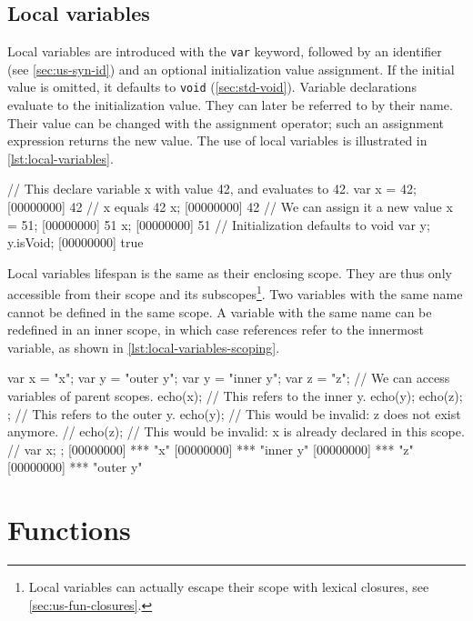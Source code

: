 \subsection{Local variables}

Local variables are introduced with the \lstinline|var| keyword,
followed by an identifier (see \autoref{sec:us-syn-id}) and an optional
initialization value assignment. If the initial value is omitted, it
defaults to \lstinline"void" (\autoref{sec:std-void}). Variable
declarations evaluate to
the initialization value. They can later be referred to by their
name. Their value can be changed with the assignment operator; such an
assignment expression returns the new value. The use of local
variables is illustrated in \autoref{lst:local-variables}.

\begin{urbiscript}[caption=Using local variables,
  label=lst:local-variables,float=\floatpos]
// This declare variable x with value 42, and evaluates to 42.
var x = 42;
[00000000] 42
// x equals 42
x;
[00000000] 42
// We can assign it a new value
x = 51;
[00000000] 51
x;
[00000000] 51
// Initialization defaults to void
var y;
y.isVoid;
[00000000] true
\end{urbiscript}

Local variables lifespan is the same as their enclosing scope. They
are thus only accessible from their scope and its
subscopes\footnote{Local variables can actually escape their scope
  with lexical closures, see \autoref{sec:us-fun-closures}.}. Two
variables with the same name cannot be defined in the same scope. A
variable with the same name can be redefined in an inner scope, in which
case references refer to the innermost variable, as shown in
\autoref{lst:local-variables-scoping}.

\begin{urbiscript}[caption=Local variables scoping,
  label=lst:local-variables-scoping,float=\floatpos]
{
  var x = "x";
  var y = "outer y";
  {
    var y = "inner y";
    var z = "z";
    // We can access variables of parent scopes.
    echo(x);
    // This refers to the inner y.
    echo(y);
    echo(z);
  };
  // This refers to the outer y.
  echo(y);
  // This would be invalid: z does not exist anymore.
  // echo(z);
  // This would be invalid: x is already declared in this scope.
  // var x;
};
[00000000] *** "x"
[00000000] *** "inner y"
[00000000] *** "z"
[00000000] *** "outer y"
\end{urbiscript}

\FloatBarrier
\section{Functions}

